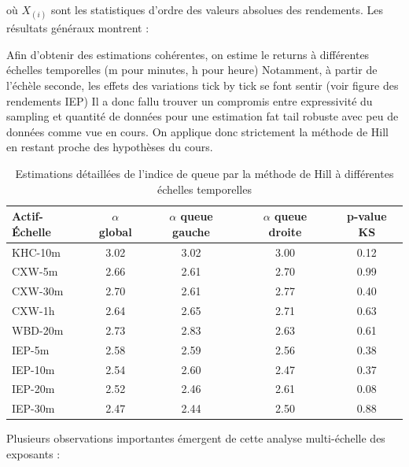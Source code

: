 \documentclass[10pt,a4paper]{article}
\theoremstyle{definition}
\theoremstyle{remark}
\begin{document}
\begin{itemize}
où $X_{(i)}$ sont les statistiques d'ordre des valeurs absolues des rendements. Les résultats généraux montrent :

Afin d'obtenir des estimations cohérentes, on estime le returns à différentes échelles temporelles (m pour minutes, h pour heure)
Notamment, à partir de l'échèle seconde, les effets des variations tick by tick se font sentir (voir figure des rendements IEP)
Il a donc fallu trouver un compromis entre expressivité du sampling et quantité de données pour une estimation fat tail robuste avec peu de données comme vue en cours.
On applique donc strictement la méthode de Hill en restant proche des hypothèses du cours.



\begin{table}[H]
\centering
\begin{tabular}{lcccc}
\toprule
Actif-Échelle & $\alpha$ global & $\alpha$ queue gauche & $\alpha$ queue droite & p-value KS \\
\midrule
KHC-10m & 3.02 & 3.02 & 3.00 & 0.12 \\
\midrule
CXW-5m & 2.66 & 2.61 & 2.70 & 0.99 \\
CXW-30m & 2.70 & 2.61 & 2.77 & 0.40 \\
CXW-1h & 2.64 & 2.65 & 2.71 & 0.63 \\
\midrule
WBD-20m & 2.73 & 2.83 & 2.63 & 0.61 \\
\midrule
IEP-5m & 2.58 & 2.59 & 2.56 & 0.38 \\
IEP-10m & 2.54 & 2.60 & 2.47 & 0.37 \\
IEP-20m & 2.52 & 2.46 & 2.61 & 0.08 \\
IEP-30m & 2.47 & 2.44 & 2.50 & 0.88 \\
\bottomrule
\end{tabular}
\caption{Estimations détaillées de l'indice de queue par la méthode de Hill à différentes échelles temporelles}
\label{tab:hill_detail_moved}
\end{table}

Plusieurs observations importantes émergent de cette analyse multi-échelle des exposants :


\end{itemize}
\end{document}
